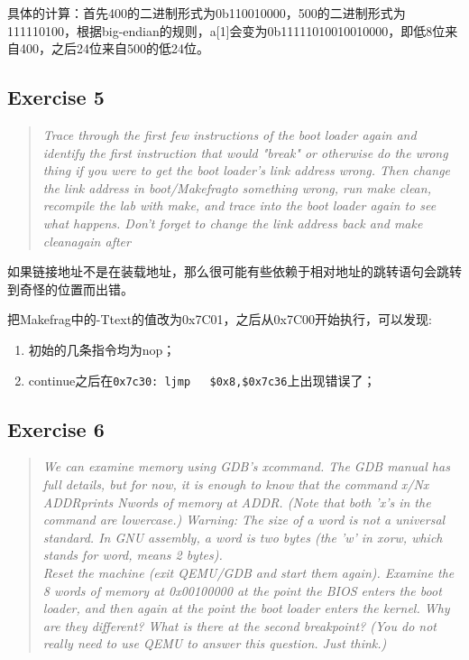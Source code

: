 具体的计算：首先400的二进制形式为0b110010000，500的二进制形式为111110100，根据big-endian的规则，a[1]会变为0b11111010010010000，即低8位来自400，之后24位来自500的低24位。

\subsection{Exercise 5}
\begin{quote} \textit{Trace through the first few instructions of the boot loader again and identify the first instruction that would "break" or otherwise do the wrong thing if you were to get the boot loader's link address wrong. Then change the link address in boot/Makefragto something wrong, run make clean, recompile the lab with make, and trace into the boot loader again to see what happens. Don't forget to change the link address back and make cleanagain after} \end{quote}

如果链接地址不是在装载地址，那么很可能有些依赖于相对地址的跳转语句会跳转到奇怪的位置而出错。

把Makefrag中的-Ttext的值改为0x7C01，之后从0x7C00开始执行，可以发现:
\begin{enumerate}
\item 初始的几条指令均为nop；
\item continue之后在\lstinline{0x7c30:	ljmp   $0x8,$0x7c36}上出现错误了；
\end{enumerate}

\subsection{Exercise 6}
\begin{quote} \textit{We can examine memory using GDB's xcommand. The GDB manual has full details, but for now, it is enough to know that the command x/Nx ADDRprints Nwords of memory at ADDR. (Note that both 'x's in the command are lowercase.) Warning: The size of a word is not a universal standard. In GNU assembly, a word is two bytes (the 'w' in xorw, which stands for word, means 2 bytes).\\
Reset the machine (exit QEMU/GDB and start them again). Examine the 8 words of memory at 0x00100000 at the point the BIOS enters the boot loader, and then again at the point the boot loader enters the kernel. Why are they different? What is there at the second breakpoint? (You do not really need to use QEMU to answer this question. Just think.)} \end{quote}

